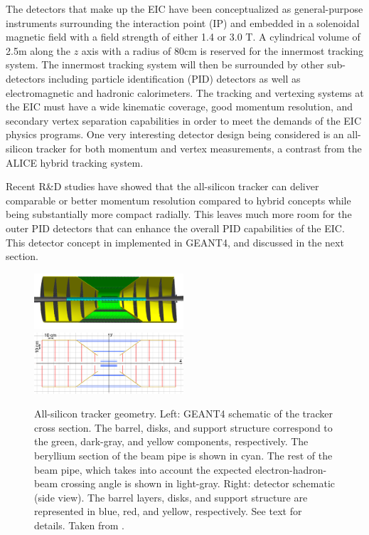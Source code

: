 The detectors that make up the EIC have been conceptualized as general-purpose instruments surrounding the interaction point (IP) and embedded in a solenoidal magnetic field with a field strength of either 1.4 or 3.0 T. A cylindrical volume of 2.5m along the $z$ axis with a radius of 80cm is reserved for the innermost tracking system. The innermost tracking system will then be surrounded by other sub-detectors including particle identification (PID) detectors as well as electromagnetic and hadronic calorimeters. The tracking and vertexing systems at the EIC must have a wide kinematic coverage, good momentum resolution, and secondary vertex separation capabilities in order to meet the demands of the EIC physics programs. One very interesting detector design being considered is an all-silicon tracker for both momentum and vertex measurements, a contrast from the ALICE hybrid tracking system.

Recent R\&D studies have showed that the all-silicon tracker can deliver comparable or better momentum resolution compared to hybrid concepts while being substantially more compact radially. This leaves much more room for the outer PID detectors that can enhance the overall PID capabilities of the EIC. This detector concept in implemented in GEANT4, and discussed in the next section.


\begin{figure}[htbp]
  \centering
  \includegraphics[width=0.495\textwidth]{EIC_Jets/all_si_model.jpg}
  \includegraphics[width=0.495\textwidth]{EIC_Jets/diagram_allsi.jpg}
  \caption{All-silicon tracker geometry.
    Left: GEANT4 schematic of the tracker cross section. The barrel, disks, and support structure correspond to the green, dark-gray, and yellow components, respectively. The beryllium section of the beam pipe is shown in cyan. The rest of the beam pipe, which takes into account the expected electron-hadron-beam crossing angle is shown in light-gray.
  Right: detector schematic (side view). The barrel layers, disks, and support structure are represented in blue, red, and yellow, respectively. See text for details. Taken from \cite{Arrington2021}.}
  \label{fig:all_si_schematic}
\end{figure}

